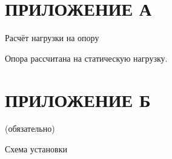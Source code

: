 \newpage
\section*{ПРИЛОЖЕНИЕ А} %

Расчёт нагрузки на опору

Опора рассчитана на статическую нагрузку.

\newpage
\section*{ПРИЛОЖЕНИЕ Б} %

(обязательно)

Схема установки
